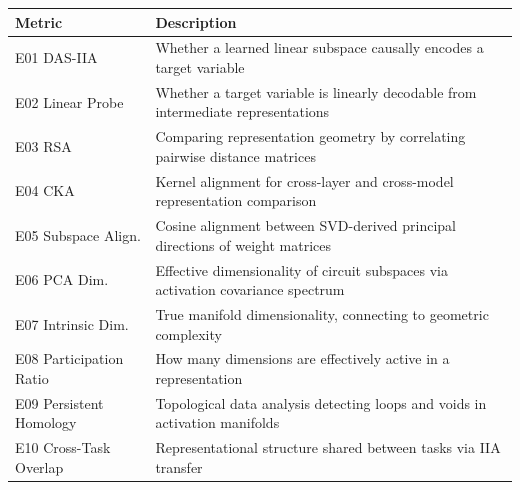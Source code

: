 \documentclass[10pt]{article}
\begin{document}
\begin{minipage}{\linewidth}
\par
\begin{center}
\begin{tabular}{@{}lp{10cm}@{}}
\toprule
\textbf{Metric} & \textbf{Description} \\
\midrule
E01 DAS-IIA & Whether a learned linear subspace causally encodes a target variable \\
\midrule
E02 Linear Probe & Whether a target variable is linearly decodable from intermediate representations \\
\midrule
E03 RSA & Comparing representation geometry by correlating pairwise distance matrices \\
\midrule
E04 CKA & Kernel alignment for cross-layer and cross-model representation comparison \\
\midrule
E05 Subspace Align. & Cosine alignment between SVD-derived principal directions of weight matrices \\
\midrule
E06 PCA Dim. & Effective dimensionality of circuit subspaces via activation covariance spectrum \\
\midrule
E07 Intrinsic Dim. & True manifold dimensionality, connecting to geometric complexity \\
\midrule
E08 Participation Ratio & How many dimensions are effectively active in a representation \\
\midrule
E09 Persistent Homology & Topological data analysis detecting loops and voids in activation manifolds \\
\midrule
E10 Cross-Task Overlap & Representational structure shared between tasks via IIA transfer \\
\bottomrule
\end{tabular}
\end{center}
\end{minipage}

\end{document}
